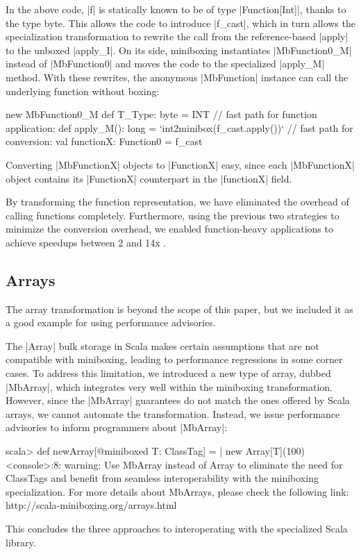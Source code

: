 In the above code, |f| is statically known to be of type |Function[Int]|, thanks to the type byte. This allows the code to introduce |f_cast|, which in turn allows the specialization transformation to rewrite the call from the reference-based |apply| to the unboxed |apply_I|. On its side, miniboxing instantiates |MbFunction0_M| instead of |MbFunction0| and moves the code to the specialized |apply_M| method. With these rewrites, the anonymous |MbFunction| instance can call the underlying function without boxing:

\begin{lstlisting-nobreak}
   new MbFunction0_M {
     def T_Type: byte = INT
     // fast path for function application:
     def apply_M(): long = `int2minibox(f_cast.apply())`
     // fast path for conversion:
     val functionX: Function0 = f_cast
   }
\end{lstlisting-nobreak}

Converting |MbFunctionX| objects to |FunctionX| easy, since each |MbFunctionX| object contains its |FunctionX| counterpart in the |functionX| field.

By transforming the function representation, we have eliminated the overhead of calling functions completely. Furthermore, using the previous two strategies to minimize the conversion overhead, we enabled function-heavy applications to achieve speedups between 2 and 14x \cite{ildl-tech, ildl-plugin-wiki}. 

\subsection{Arrays}
\label{mbox2:sec:mbarrays}

The array transformation \cite{romain-mbarrays} is beyond the scope of this paper, but we included it as a good example for using performance advisories.

The |Array| bulk storage in Scala makes certain assumptions that are not compatible with miniboxing, leading to performance regressions in some corner cases. To address this limitation, we introduced a new type of array, dubbed |MbArray|, which integrates very well within the miniboxing transformation. However, since the |MbArray| guarantees do not match the ones offered by Scala arrays, we cannot automate the transformation. Instead, we issue performance advisories to inform programmers about |MbArray|:

\begin{lstlisting-nobreak-nolang}
scala> def newArray[@miniboxed T: ClassTag] =
       |   new Array[T](100)
<console>:8: warning: Use MbArray instead of Array to eliminate the need for ClassTags and benefit from seamless interoperability with the miniboxing specialization. For more details about MbArrays, please check the following link: http://scala-miniboxing.org/arrays.html
\end{lstlisting-nobreak-nolang}

This concludes the three approaches to interoperating with the specialized Scala library.